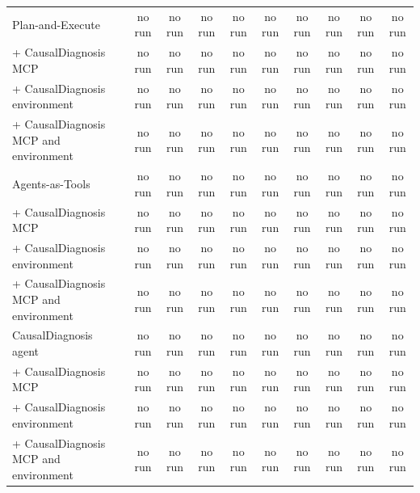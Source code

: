\documentclass[10pt]{article}
\begin{document}
\begin{table}[H]
\begin{tabular}{lccccccccc}
\midrule
Plan-and-Execute & no run & no run & no run & no run & no run & no run & no run & no run & no run \\
\quad + CausalDiagnosis MCP & no run & no run & no run & no run & no run & no run & no run & no run & no run \\
\quad + CausalDiagnosis environment & no run & no run & no run & no run & no run & no run & no run & no run & no run \\
\quad + CausalDiagnosis MCP and environment & no run & no run & no run & no run & no run & no run & no run & no run & no run \\
\addlinespace[3pt]
Agents-as-Tools & no run & no run & no run & no run & no run & no run & no run & no run & no run \\
\quad + CausalDiagnosis MCP & no run & no run & no run & no run & no run & no run & no run & no run & no run \\
\quad + CausalDiagnosis environment & no run & no run & no run & no run & no run & no run & no run & no run & no run \\
\quad + CausalDiagnosis MCP and environment & no run & no run & no run & no run & no run & no run & no run & no run & no run \\
\addlinespace[3pt]
CausalDiagnosis agent & no run & no run & no run & no run & no run & no run & no run & no run & no run \\
\quad + CausalDiagnosis MCP & no run & no run & no run & no run & no run & no run & no run & no run & no run \\
\quad + CausalDiagnosis environment & no run & no run & no run & no run & no run & no run & no run & no run & no run \\
\quad + CausalDiagnosis MCP and environment & no run & no run & no run & no run & no run & no run & no run & no run & no run \\
\bottomrule
\end{tabular}
\end{table}
\vspace{-8pt}
\end{document}
